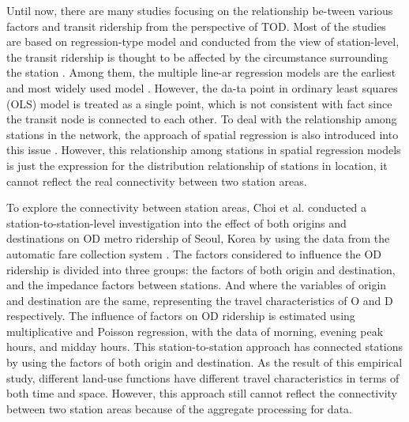 \documentclass[utf8]{article}
\begin{document}
%
Until now, there are many studies focusing on the relationship be-tween various factors and transit ridership from the perspective of TOD. Most of the studies are based on regression-type model and conducted from the view of station-level, the transit ridership is thought to be affected by the circumstance surrounding the station \cite{Cervero1997,Taylor2003,Zhao2005,Estupinan2008,Taylor2009,Sohn2010,Gutierrez2011,Jun2015}. Among them, the multiple line-ar regression models are the earliest and most widely used model \cite{Cervero1997,Gutierrez2011}. However, the da-ta point in ordinary least squares (OLS) model is treated as a single point, which is not consistent with fact since the transit node is connected to each other. To deal with the relationship among stations in the network, the approach of spatial regression is also introduced into this issue \cite{Cardozo2012,Jun2015}. However, this relationship among stations in spatial regression models is just the expression for the distribution relationship of stations in location, it cannot reflect the real connectivity between two station areas.

%
To explore the connectivity between station areas, Choi et al. conducted a station-to-station-level investigation into the effect of both origins and destinations on OD metro ridership of Seoul, Korea by using the data from the automatic fare collection system \cite{Choi2012}. The factors considered to influence the OD ridership is divided into three groups: the factors of both origin and destination, and the impedance factors between stations. And where the variables of origin and destination are the same, representing the travel characteristics of O and D respectively. The influence of factors on OD ridership is estimated using multiplicative and Poisson regression, with the data of morning, evening peak hours, and midday hours. This station-to-station approach has connected stations by using the factors of both origin and destination. As the result of this empirical study, different land-use functions have different travel characteristics in terms of both time and space. However, this approach still cannot reflect the connectivity between two station areas because of the aggregate processing for data.
\end{document}
